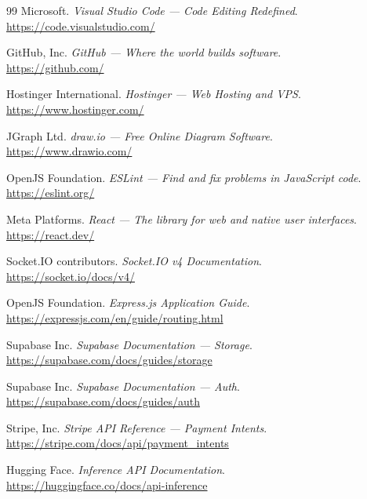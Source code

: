 \documentclass[12pt, a4paper, oneside]{report}
\begin{document}
\begin{thebibliography}{99}
Microsoft. \textit{Visual Studio Code --- Code Editing Redefined}.\\
\url{https://code.visualstudio.com/} 

GitHub, Inc. \textit{GitHub --- Where the world builds software}.\\
\url{https://github.com/} 

Hostinger International. \textit{Hostinger --- Web Hosting and VPS}.\\
\url{https://www.hostinger.com/} 

JGraph Ltd. \textit{draw.io --- Free Online Diagram Software}.\\
\url{https://www.drawio.com/} 

OpenJS Foundation. \textit{ESLint --- Find and fix problems in JavaScript code}.\\
\url{https://eslint.org/} 

Meta Platforms. \textit{React --- The library for web and native user interfaces}.\\
\url{https://react.dev/} 

Socket.IO contributors. \textit{Socket.IO v4 Documentation}.\\
\url{https://socket.io/docs/v4/} 

OpenJS Foundation. \textit{Express.js Application Guide}.\\
\url{https://expressjs.com/en/guide/routing.html} 

Supabase Inc. \textit{Supabase Documentation --- Storage}.\\
\url{https://supabase.com/docs/guides/storage} 

Supabase Inc. \textit{Supabase Documentation --- Auth}.\\
\url{https://supabase.com/docs/guides/auth} 

Stripe, Inc. \textit{Stripe API Reference --- Payment Intents}.\\
\url{https://stripe.com/docs/api/payment_intents} 

Hugging Face. \textit{Inference API Documentation}.\\
\url{https://huggingface.co/docs/api-inference} 


\end{thebibliography}
\end{document}
